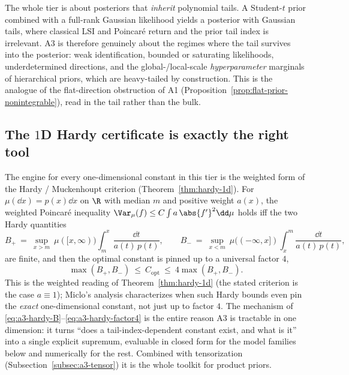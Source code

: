 \documentclass[../../main.tex]{subfiles}
\begin{document}
\begin{warning}
\label{warn:a3-likelihood}
The whole tier is about posteriors that \emph{inherit} polynomial tails. A Student-$t$ prior
combined with a full-rank Gaussian likelihood yields a posterior with Gaussian tails, where
classical LSI and Poincar\'e return and the prior tail index is irrelevant. A3 is therefore
genuinely about the regimes where the tail survives into the posterior: weak identification,
bounded or saturating likelihoods, underdetermined directions, and the global-/local-scale
\emph{hyperparameter} marginals of hierarchical priors, which are heavy-tailed by construction.
This is the analogue of the flat-direction obstruction of A1
(Proposition~\ref{prop:flat-prior-nonintegrable}), read in the tail rather than the bulk.
\end{warning}

\subsection{The \texorpdfstring{$1$D}{1D} Hardy certificate is exactly the right tool}
\label{subsec:a3-hardy}

The engine for every one-dimensional constant in this tier is the weighted form of the Hardy /
Muckenhoupt criterion (Theorem~\ref{thm:hardy-1d}). For $\mu(\dd x)=p(x)\dd x$ on $\R$ with median
$m$ and positive weight $a(x)$, the weighted Poincar\'e inequality
$\Var_\mu(f)\le C\int a\,\abs{f'}^2\dd\mu$ holds iff the two Hardy quantities
\begin{equation}\label{eq:a3-hardy-B}
  B_+\ =\ \sup_{x>m}\ \mu([x,\infty))\int_m^x\frac{\dd t}{a(t)\,p(t)},
  \qquad
  B_-\ =\ \sup_{x<m}\ \mu((-\infty,x])\int_x^m\frac{\dd t}{a(t)\,p(t)},
\end{equation}
are finite, and then the optimal constant is pinned up to a universal factor $4$,
\begin{equation}\label{eq:a3-hardy-factor4}
  \max(B_+,B_-)\ \le\ C_{\mathrm{opt}}\ \le\ 4\max(B_+,B_-).
\end{equation}
This is the weighted reading of Theorem~\ref{thm:hardy-1d} (the stated criterion is the case
$a\equiv1$); Miclo's analysis \cite{Miclo2008Hardy} characterizes when such Hardy bounds even
pin the \emph{exact} one-dimensional constant, not just up to factor $4$. The mechanism of
\eqref{eq:a3-hardy-B}--\eqref{eq:a3-hardy-factor4} is the entire reason A3 is tractable in one
dimension: it turns ``does a tail-index-dependent constant exist, and what is it'' into a single
explicit supremum, evaluable in closed form for the model families below and numerically for the
rest. Combined with tensorization (Subsection~\ref{subsec:a3-tensor}) it is the whole toolkit for
product priors.
\end{document}
